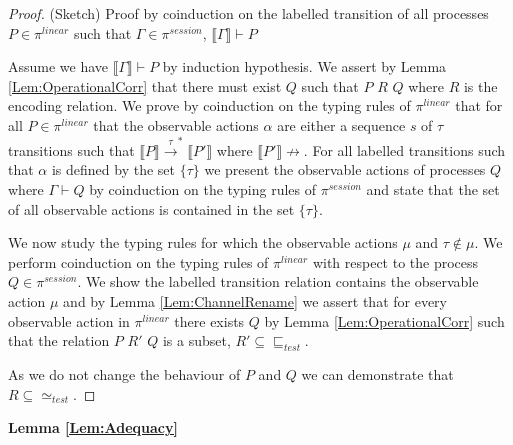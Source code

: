 \begin{proof}
(Sketch)
Proof by coinduction on the labelled transition of all processes $P \in \pi^{linear}$ such that $\Gamma \in \pi^{session}$, $\llbracket \Gamma \rrbracket \vdash P$


Assume we have $\llbracket \Gamma \rrbracket \vdash P$ by induction hypothesis. We assert by Lemma \ref{Lem:OperationalCorr} that there must exist $Q$ such that $P$ $R$ $Q$ where $R$ is the encoding relation. We prove by coinduction on the typing rules of $\pi^{linear}$ that for all $P \in \pi^{linear}$ that the observable actions $\alpha$ are either a sequence $s$ of $\tau$ transitions such that $\llbracket P \rrbracket \xrightarrow{\tau}^* \llbracket P' \rrbracket$ where $\llbracket P' \rrbracket \not \rightarrow$. For all labelled transitions such that $\alpha$ is defined by the set $\{ \tau \}$ we present the observable actions of processes $Q$ where $\Gamma \vdash Q$ by coinduction on the typing rules of $\pi^{session}$ and state that the set of all observable actions is contained in the set $\{\tau\}$.

We now study the typing rules for which the observable actions $\mu$ and $\tau \not \in \mu$. We perform coinduction on the typing rules of $\pi^{linear}$ with respect to the process $Q \in \pi^{session}$. We show the labelled transition relation contains the observable action $\mu$ and by Lemma \ref{Lem:ChannelRename} we assert that for every observable action in $\pi^{linear}$ there exists $Q$ by Lemma \ref{Lem:OperationalCorr} such that the relation $P$ $R'$ $Q$ is a subset, $R' \subseteq \sqsubseteq_{test}$. 

As we do not change the behaviour of $P$ and $Q$ we can demonstrate that $R \subseteq \simeq_{test}$.

 \end{proof}

\vspace{10pt}


\textbf{Lemma \ref{Lem:Adequacy}}

